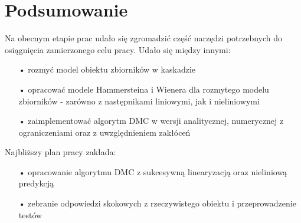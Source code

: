 \chapter{Podsumowanie}
Na obecnym etapie prac udało się zgromadzić część narzędzi potrzebnych do osiągnięcia zamierzonego celu pracy. Udało się między innymi:

\begin{itemize}
\item[•] rozmyć model obiektu zbiorników w kaskadzie
\item[•] opracować modele Hammersteina i Wienera dla rozmytego modelu zbiorników - zarówno z następnikami liniowymi, jak i nieliniowymi
\item[•] zaimplementować algorytm DMC w wersji analitycznej, numerycznej z ograniczeniami oraz z uwzględnieniem zakłóceń
\end{itemize}

Najbliższy plan pracy zakłada:
\begin{itemize}
\item[•] opracowanie algorytmu DMC z sukcesywną linearyzacją oraz nieliniową predykcją
\item[•] zebranie odpowiedzi skokowych z rzeczywistego obiektu i przeprowadzenie testów
\end{itemize}